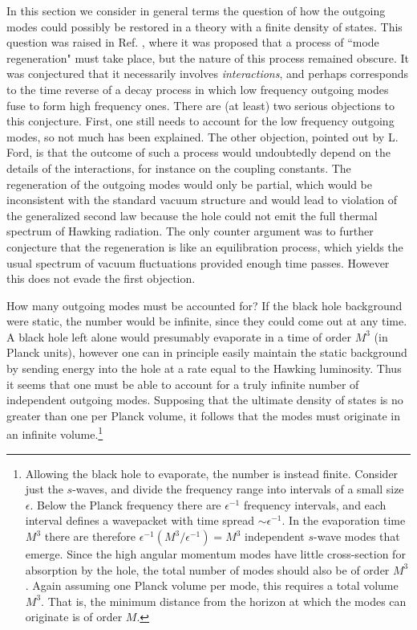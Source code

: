 \documentclass[12pt]{article}
\begin{document}
In this section we consider in general terms the question of how the
outgoing modes could possibly be restored in a theory with a finite
density of states.  This question was raised in Ref. \cite{Jaco1},
where it was proposed that a process of ``mode regeneration" must take
place, but the nature of this process remained obscure.  It was
conjectured that it necessarily involves {\it interactions}, and
perhaps corresponds to the time reverse of a decay process in which low
frequency outgoing modes fuse to form high frequency ones.  There are
(at least) two serious objections to this conjecture.  First, one still
needs to account for the low frequency outgoing modes, so not much has
been explained. The other objection, pointed out by L.
Ford\cite{Fordpc}, is that the outcome of such a process would
undoubtedly depend on the details of the interactions, for instance on
the coupling constants. The regeneration of the outgoing modes would
only be partial, which would be inconsistent with the standard vacuum
structure and would lead to violation of the generalized second law
because the hole could not emit the full thermal spectrum of Hawking
radiation. The only counter argument\cite{Jaco1} was to further
conjecture that the regeneration is like an equilibration process,
which yields the usual spectrum of vacuum fluctuations provided enough
time passes.  However this does not evade the first objection.

How many outgoing modes must be accounted for? If the black hole
background were static, the number would be infinite, since they could
come out at any time. A black hole left alone would presumably
evaporate in a time of order $M^3$ (in Planck units), however one can
in principle easily maintain the static background by sending energy
into the hole at a rate equal to the Hawking luminosity. Thus it seems
that one must be able to account for a truly infinite number of
independent outgoing modes.  Supposing that the ultimate density of
states is no greater than one per Planck volume, it follows that the
modes must originate in an infinite volume.\footnote{Allowing the black
hole to evaporate, the number is instead finite. Consider just the
$s$-waves, and divide the frequency range into intervals of a small
size $\epsilon$. Below the Planck frequency there are ${\epsilon}^{-1}$
frequency intervals, and each interval defines a wavepacket with time
spread $\sim {\epsilon}^{-1}$. In the evaporation time $M^3$ there are
therefore ${\epsilon}^{-1}(M^3/{\epsilon}^{-1})=M^3$ independent
$s$-wave modes that emerge. Since the high angular momentum modes have
little cross-section for absorption by the hole, the total number of
modes should also be of order $M^3$. Again assuming one Planck volume
per mode, this requires a total volume $M^3$.  That is, the minimum
distance from the horizon at which the modes can originate is of order
$M$.}
\end{document}
